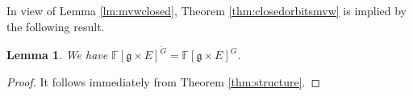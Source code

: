 \documentclass[12pt]{amsart}
\newtheorem{lm}{Lemma}[section]
\theoremstyle{definition}
\theoremstyle{remark}\newtheorem{rmk}[lm]{Remark}
\newcommand{\RO}{{\mathrm {O}}}
\newcommand{\GL}{{\mathrm{GL}}}
\newcommand{\Sp}{{\mathrm{Sp}}}
\newcommand{\tr}{{\mathrm{tr}}}
\newcommand{\g}{\mathfrak g}
\renewcommand{\o}{\mathfrak o}
\newcommand{\gl}{\mathfrak g \mathfrak l}
\renewcommand{\sp}{\mathfrak s \mathfrak p}
\newcommand{\C}{\mathbb{F}}
\begin{document}
In view of Lemma \ref{lm:mvwclosed}, Theorem \ref{thm:closedorbitsmvw} is implied by the following result. 
	\begin{lm}
		\label{lm:mvwinvariant}
		We have $\C[\g\times E]^{\breve{G}}=\C[\g\times E]^{G}$.
	\end{lm}
	\begin{proof}
		It follows immediately from Theorem \ref{thm:structure}.
		
    
		
		
	\end{proof}
    
\end{document}
